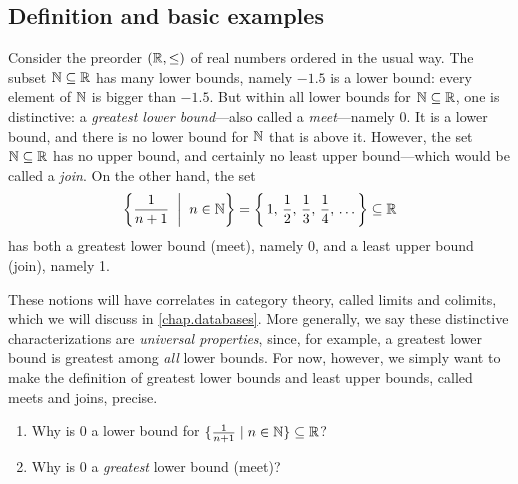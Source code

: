\documentclass[7Sketches]{subfiles}
\begin{document}
\subsection{Definition and basic examples}%
Consider the preorder $(\mathbb{R},\leq)$ of real numbers ordered in the usual way. The
subset $\mathbb{N}\subseteq\mathbb{R}$ has many lower bounds, namely $-1.5$ is a lower bound: every element of $\mathbb{N}$ is bigger than $-1.5$. But within all lower bounds for $\mathbb{N}\subseteq\mathbb{R}$, one is distinctive: a \emph{greatest lower bound}---also called a \emph{meet}---namely 0. It is a lower bound, and there is no lower bound for $\mathbb{N}$ that is above it. However, the set $\mathbb{N}\subseteq\mathbb{R}$ has no upper bound, and certainly no least upper bound---which would be called a \emph{join}. On the other hand, the set
\[
  \left\{\frac{1}{n+1}\;\;\middle|\;\; n\in\mathbb{N}\right\}
  =
  \left\{\,1,\,\frac12,\,\frac13,\,\frac14,\,\ldots\,\right\}\subseteq\mathbb{R}
\]
has both a greatest lower bound (meet), namely 0, and a least upper bound (join), namely 1.

These notions will have correlates in category theory, called limits and
colimits, which we will discuss in \cref{chap.databases}. More generally, we
say these distinctive characterizations are \emph{universal properties}, since,
for example, a greatest lower bound is greatest among \emph{all} lower bounds.
For now, however, we simply want to make the definition of greatest lower
bounds and least upper bounds, called meets and joins, precise.%
%
%

\begin{exercise}%
\label{exc.0_glb}
\begin{enumerate}
	\item Why is $0$ a lower bound for $\{\frac{1}{n+1}\mid n\in\mathbb{N}\}\subseteq\mathbb{R}$?
	\item Why is $0$ a \emph{greatest} lower bound (meet)?
\qedhere
\end{enumerate}
\end{exercise}
\end{document}
